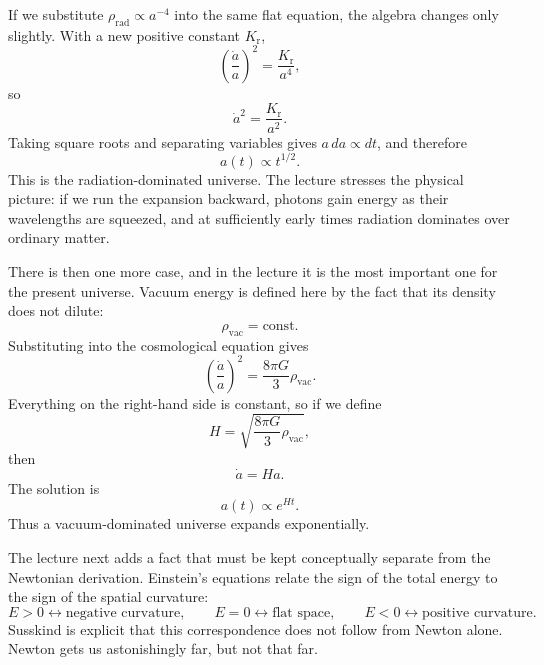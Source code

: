 If we substitute \(\rho_{\mathrm{rad}}\propto a^{-4}\) into the same flat equation, the algebra changes only slightly. With a new positive constant \(K_{\mathrm r}\),
\begin{equation}
\left(\frac{\dot a}{a}\right)^2=\frac{K_{\mathrm r}}{a^4},
\end{equation}
so
\begin{equation}
\dot a^2=\frac{K_{\mathrm r}}{a^2}.
\end{equation}
Taking square roots and separating variables gives \(a\,da\propto dt\), and therefore
\begin{equation}
a(t)\propto t^{1/2}.
\end{equation}
This is the radiation-dominated universe. The lecture stresses the physical picture: if we run the expansion backward, photons gain energy as their wavelengths are squeezed, and at sufficiently early times radiation dominates over ordinary matter.

There is then one more case, and in the lecture it is the most important one for the present universe. Vacuum energy is defined here by the fact that its density does not dilute:
\begin{equation}
\rho_{\mathrm{vac}}=\text{const}.
\end{equation}
Substituting into the cosmological equation gives
\begin{equation}
\left(\frac{\dot a}{a}\right)^2=\frac{8\pi G}{3}\rho_{\mathrm{vac}}.
\end{equation}
Everything on the right-hand side is constant, so if we define
\begin{equation}
H=\sqrt{\frac{8\pi G}{3}\rho_{\mathrm{vac}}},
\end{equation}
then
\begin{equation}
\dot a = H a.
\end{equation}
The solution is
\begin{equation}
a(t)\propto e^{Ht}.
\end{equation}
Thus a vacuum-dominated universe expands exponentially.

The lecture next adds a fact that must be kept conceptually separate from the Newtonian derivation. Einstein's equations relate the sign of the total energy to the sign of the spatial curvature:
\begin{equation}
E>0 \leftrightarrow \text{negative curvature},
\qquad
E=0 \leftrightarrow \text{flat space},
\qquad
E<0 \leftrightarrow \text{positive curvature}.
\end{equation}
Susskind is explicit that this correspondence does not follow from Newton alone. Newton gets us astonishingly far, but not that far.

